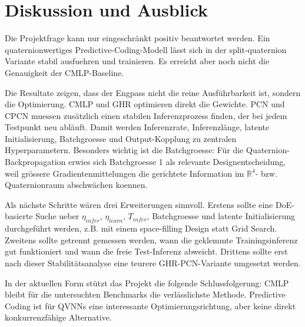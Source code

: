 \section{Diskussion und Ausblick}

Die Projektfrage kann nur eingeschränkt positiv beantwortet werden. Ein quaternionwertiges Predictive-Coding-Modell lässt sich in der split-quaternion Variante stabil ausfuehren und trainieren. Es erreicht aber noch nicht die Genauigkeit der CMLP-Baseline.

Die Resultate zeigen, dass der Engpass nicht die reine Ausführbarkeit ist, sondern die Optimierung. CMLP und GHR optimieren direkt die Gewichte. PCN und CPCN muessen zusätzlich einen stabilen Inferenzprozess finden, der bei jedem Testpunkt neu abläuft. Damit werden Inferenzrate, Inferenzlänge, latente Initialisierung, Batchgroesse und Output-Kopplung zu zentralen Hyperparametern. Besonders wichtig ist die Batchgroesse: Für die Quaternion-Backpropagation erwies sich Batchgroesse 1 als relevante Designentscheidung, weil grössere Gradientenmittelungen die gerichtete Information im $\mathbb{R}^4$- bzw. Quaternionraum abschwächen koennen.

Als nächste Schritte wären drei Erweiterungen sinnvoll. Erstens sollte eine DoE-basierte Suche ueber $\eta_{infer}$, $\eta_{learn}$, $T_{infer}$, Batchgroesse und latente Initialisierung durchgeführt werden, z.B. mit einem space-filling Design statt Grid Search. Zweitens sollte getrennt gemessen werden, wann die geklemmte Trainingsinferenz gut funktioniert und wann die freie Test-Inferenz abweicht. Drittens sollte erst nach dieser Stabilitätsanalyse eine teurere GHR-PCN-Variante umgesetzt werden.

In der aktuellen Form stützt das Projekt die folgende Schlussfolgerung: CMLP bleibt für die untersuchten Benchmarks die verlässlichste Methode. Predictive Coding ist für QVNNs eine interessante Optimierungsrichtung, aber keine direkt konkurrenzfähige Alternative.
